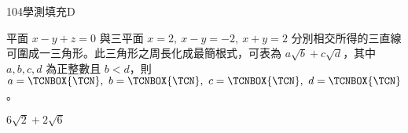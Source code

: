 \begin{QUESTIONS}
\begin{QUESTION}
    \end{QUESTION}
    \begin{QUESTION}
        \begin{ExamInfo}{104}{學測}{填充}{D}
        \end{ExamInfo}
        \begin{ExamAnsRateInfo}{13}{36}{3}{0}
        \end{ExamAnsRateInfo}
        \begin{QBODY}
            平面 $x-y+z=0$ 與三平面 $x=2,\ x-y=-2,\ x+y=2$ 分別相交所得的三直線可圍成一三角形。此三角形之周長化成最簡根式，可表為 $a\sqrt{b}+c\sqrt{d}$，其中 $a,b,c,d$ 為正整數且 $b<d$，則 $a=\TCNBOX{\TCN },\ b=\TCNBOX{\TCN },\ c=\TCNBOX{\TCN },\ d=\TCNBOX{\TCN }$。
        \end{QBODY}
        \begin{QFROMS}
        \end{QFROMS}
        \begin{QTAGS}\end{QTAGS}
        \begin{QANS}
            $6 \sqrt{2} + 2\sqrt{6}$
        \end{QANS}
        \begin{QSOLLIST}
\end{QSOLLIST}
\end{QUESTION}
\end{QUESTIONS}
